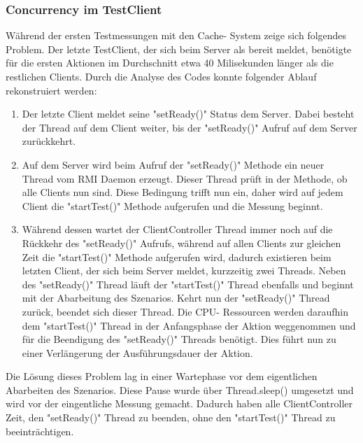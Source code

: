\subsubsection{Concurrency im TestClient}
\label{sec:concurrencyTestClient}
Während der ersten Testmessungen mit den Cache- System zeige sich folgendes Problem. Der letzte TestClient, der sich beim Server als bereit meldet, benötigte für die ersten Aktionen im Durchschnitt etwa 40 Milisekunden länger als die restlichen Clients. Durch die Analyse des Codes konnte folgender Ablauf rekonstruiert werden:
\begin{enumerate}
\item Der letzte Client meldet seine "setReady()" Status dem Server. Dabei besteht der Thread auf dem Client weiter, bis der "setReady()" Aufruf auf dem Server zurückkehrt.
\item Auf dem Server wird beim Aufruf der "setReady()" Methode ein neuer Thread vom RMI Daemon erzeugt. Dieser Thread prüft in der Methode, ob alle Clients nun sind. Diese Bedingung trifft nun ein, daher wird auf jedem Client die "startTest()" Methode aufgerufen und die Messung beginnt.
\item Während dessen wartet der Client\-Controller Thread immer noch auf die Rückkehr des "setReady()" Aufrufs, während auf allen Clients zur gleichen Zeit die "startTest()" Methode aufgerufen wird, dadurch existieren beim letzten Client, der sich beim Server meldet, kurz\-zeitig zwei Threads. Neben des "set\-Ready()" Thread läuft der "start\-Test()" Th\-read eben\-falls und be\-ginnt mit der Ab\-ar\-bei\-tung des Sze\-nar\-ios. Kehrt nun der "set\-Ready()" Th\-read zu\-rück, be\-endet sich dieser Th\-read. Die CPU- Res\-sour\-cen werden da\-rauf\-hin dem "startTest()" Thread in der Anfangs\-phase der Aktion weg\-ge\-nommen und für die Be\-endi\-gung des "setReady()" Threads benötigt. Dies führt nun zu einer Verlängerung der Ausführungsdauer der Aktion.
\end{enumerate}
Die Lösung dieses Problem lag in einer Wartephase vor dem eigentlichen Abarbeiten des Szenarios. Diese Pause wurde über Thread.sleep() umgesetzt und wird vor der eingentliche Messung gemacht. Dadurch haben alle ClientController Zeit, den "setReady()" Thread zu beenden, ohne den "startTest()" Thread zu beeinträchtigen.




